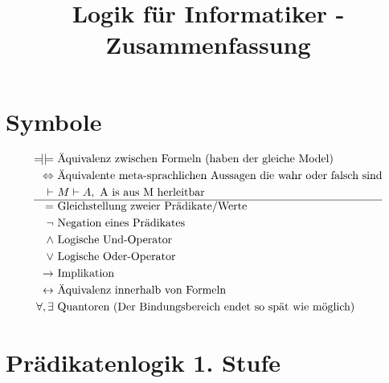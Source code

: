 \documentclass{article}
\title{Logik f\"ur Informatiker - Zusammenfassung}
\DeclareRobustCommand*{\tautequiv}{%
  \Relbar\joinrel\mathrel{|}
  \mathrel{|}\joinrel\Relbar%
}
\begin{document}
	\section*{Symbole}
		\begin{align*}
			\tautequiv & \text{ \"Aquivalenz zwischen Formeln (haben der gleiche Model)}\\
			\Leftrightarrow & \text{ \"Aquivalente meta-sprachlichen Aussagen die wahr oder falsch sind}\\
			\vdash &\ M \vdash A, \text{ A is aus M herleitbar}\\
			\hline
			= & \text{ Gleichstellung zweier Pr\"adikate/Werte}\\
			\neg & \text{ Negation eines Pr\"adikates}\\
			\wedge & \text{ Logische Und-Operator}\\
			\vee & \text{ Logische Oder-Operator}\\
			\rightarrow & \text{ Implikation}\\
			\leftrightarrow & \text{ \"Aquivalenz innerhalb von Formeln}\\
			\forall, \exists & \text{ Quantoren (Der Bindungsbereich endet so sp\"at wie m\"oglich)}\\
		\end{align*}
	\section{Pr\"adikatenlogik 1. Stufe}
\end{document}
